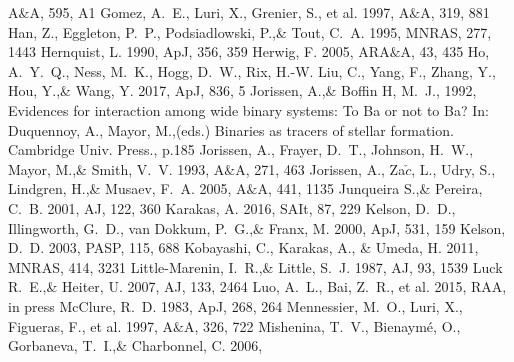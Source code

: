 \documentclass[a4paper,fleqn,usenatbib]{mnras}
\begin{document}
\begin{thebibliography}{99}
A$\&$A, 595, A1
Gomez, A.~E., Luri, X., Grenier, S., et al. 1997, 
A$\&$A, 319, 881
Han, Z., Eggleton, P.~P., Podsiadlowski, P.,\& Tout, C.~A. 1995, 
MNRAS, 277, 1443
Hernquist, L. 1990, 
ApJ, 356, 359
Herwig, F. 2005, 
ARA$\&$A, 43, 435
Ho, A.~Y.~Q., Ness, M.~K., Hogg, D.~W., Rix, H.-W. Liu, C., Yang, F., Zhang, Y., Hou, Y.,\& Wang, Y. 2017, 
ApJ, 836, 5
Jorissen, A.,\& Boffin H, M.~J., 1992, 
Evidences for interaction among wide binary systems: To Ba or not to Ba? In: Duquennoy, A., Mayor, M.,(eds.) Binaries as tracers of stellar formation. Cambridge Univ. Press., p.185
Jorissen, A., Frayer, D.~T., Johnson, H.~W., Mayor, M.,\& Smith, V.~V. 1993, 
A$\&$A, 271, 463
Jorissen, A., Za$\check{c}$, L., Udry, S., Lindgren, H.,\& Musaev, F.~A. 2005, 
A$\&$A, 441, 1135
Junqueira S.,\& Pereira, C.~B. 2001, 
AJ, 122, 360
Karakas, A. 2016, 
SAIt, 87, 229
Kelson, D.~D., Illingworth, G.~D., van Dokkum, P.~G.,\& Franx, M. 2000, ApJ, 531, 159
Kelson, D.~D. 2003, 
PASP, 115, 688
Kobayashi, C., Karakas, A., \& Umeda, H. 2011, 
MNRAS, 414, 3231
Little-Marenin, I.~R.,\& Little, S.~J. 1987, 
AJ, 93, 1539
Luck R.~E.,\& Heiter, U. 2007, 
AJ, 133, 2464
Luo, A.~L., Bai, Z.~R., et al. 2015, 
RAA, in press
McClure, R.~D. 1983, 
ApJ, 268, 264
Mennessier, M.~O., Luri, X., Figueras, F., et al. 1997, 
A$\&$A, 326, 722
Mishenina, T.~V., Bienaym\' e, O., Gorbaneva, T.~I.,\& Charbonnel, C. 2006, 

\end{thebibliography}
\end{document}
